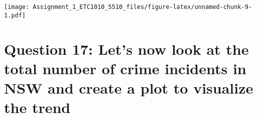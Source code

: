 \documentclass[
]{article}
\newenvironment{Shaded}{\begin{snugshade}}{\end{snugshade}}
\newcommand{\CommentTok}[1]{\textcolor[rgb]{0.56,0.35,0.01}{\textit{#1}}}
\newcommand{\DataTypeTok}[1]{\textcolor[rgb]{0.13,0.29,0.53}{#1}}
\newcommand{\KeywordTok}[1]{\textcolor[rgb]{0.13,0.29,0.53}{\textbf{#1}}}
\newcommand{\NormalTok}[1]{#1}
\newcommand{\OperatorTok}[1]{\textcolor[rgb]{0.81,0.36,0.00}{\textbf{#1}}}
\newcommand{\StringTok}[1]{\textcolor[rgb]{0.31,0.60,0.02}{#1}}
\begin{document}
\begin{Shaded}
\end{Shaded}

\texttt{[image: Assignment\_1\_ETC1010\_5510\_files/figure-latex/unnamed-chunk-9-1.pdf]}

\hypertarget{question-17-lets-now-look-at-the-total-number-of-crime-incidents-in-nsw-and-create-a-plot-to-visualize-the-trend}{%
\section{Question 17: Let's now look at the total number of crime
incidents in NSW and create a plot to visualize the
trend}\label{question-17-lets-now-look-at-the-total-number-of-crime-incidents-in-nsw-and-create-a-plot-to-visualize-the-trend}}
\end{document}
